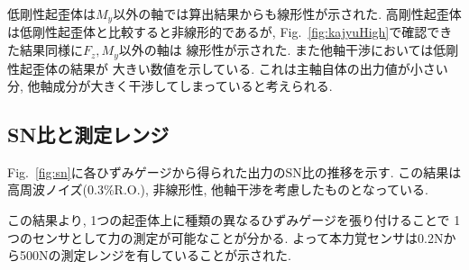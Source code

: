 低剛性起歪体は$M_y$以外の軸では算出結果からも線形性が示された. 
高剛性起歪体は低剛性起歪体と比較すると非線形的であるが, 
Fig.~\ref{fig:kajyuHigh}で確認できた結果同様に$F_z, M_y$以外の軸は
線形性が示された. また他軸干渉においては低剛性起歪体の結果が
大きい数値を示している. これは主軸自体の出力値が小さい分, 
他軸成分が大きく干渉してしまっていると考えられる. 

\subsection{SN比と測定レンジ}
Fig.~\ref{fig:sn}に各ひずみゲージから得られた出力のSN比の推移を示す. 
この結果は高周波ノイズ(0.3\%R.O.), 非線形性, 他軸干渉を考慮したものとなっている. 


この結果より, 1つの起歪体上に種類の異なるひずみゲージを張り付けることで
1つのセンサとして力の測定が可能なことが分かる.  
よって本力覚センサは0.2Nから500Nの測定レンジを有していることが示された.